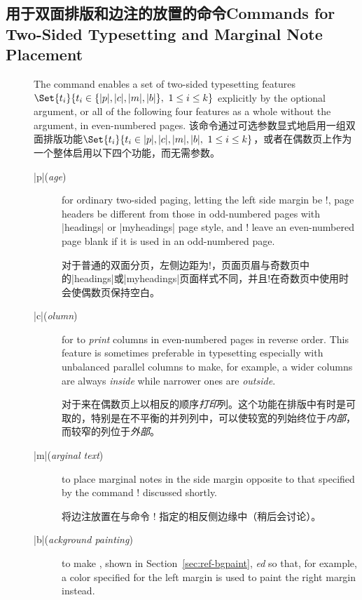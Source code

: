 
\subsection{用于双面排版和边注的放置的命令\hfill Commands for Two-Sided Typesetting and Marginal Note Placement}
\label{sec:ref-twoside}

\begin{description}
\item[\Midx{\!\twosided!}{$|[|t_1t_2\cdots t_k|]|$}]\mbox{}\par
{}
\begin{paracol}{2}
The command enables a set of two-sided typesetting features
$\Set{t_i}{t_i\in\{|p|,|c|,|m|,|b|\},\ 1\leq i\leq k}$ explicitly by the
optional argument, or all of the following four features as a whole
without the argument, in even-numbered pages.
\switchcolumn
该命令通过可选参数显式地启用一组双面排版功能$\Set{t_i}{t_i\in{|p|,|c|,|m|,|b|},\ 1\leq i\leq k}$，或者在偶数页上作为一个整体启用以下四个功能，而无需参数。    
\end{paracol}
\begin{description}
\item[|p|\rm(\textit{age})]
for ordinary two-sided paging, letting the left side margin be
\!\evensidemargin!, page headers be different from those in odd-numbered
pages with |headings| or |myheadings| page style, and \!\cleardoublepage!
leave an even-numbered page blank if it is used in an odd-numbered page.

对于普通的双面分页，左侧边距为\!\evensidemargin!，页面页眉与奇数页中的|headings|或|myheadings|页面样式不同，并且\!\cleardoublepage!在奇数页中使用时会使偶数页保持空白。
\item[|c|\rm(\textit{olumn})]
for {\em\Uidx\cswap} to \emph{print} columns in even-numbered pages in
reverse order.  This feature is sometimes preferable in typesetting
especially with unbalanced parallel columns to make, for example, a wider
columns are always \emph{inside} while narrower ones are \emph{outside}.

对于{\em\Uidx\cswap}来在偶数页上以相反的顺序\emph{打印}列。这个功能在排版中有时是可取的，特别是在不平衡的并列列中，可以使较宽的列始终位于\emph{内部}，而较窄的列位于\emph{外部}。
\item[|m|\rm(\textit{arginal text})]
to place marginal notes in the side margin opposite to that specified by
the command \!\marginparthreshold! discussed shortly.

将边注放置在与命令 \!\marginparthreshold! 指定的相反侧边缘中（稍后会讨论）。
\item[|b|\rm(\textit{ackground painting})]
to make \bgpaint, shown in Section~\ref{sec:ref-bgpaint},
\emph{\mirror{}ed} so that, for example, a color specified for the left
margin is used to paint the right margin instead.


\end{description}
\end{description}
